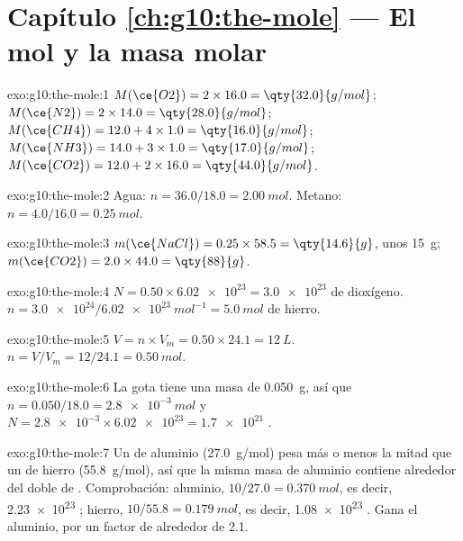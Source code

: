 \section*{Capítulo \ref{ch:g10:the-mole} --- El mol y la masa molar}

\begin{solution}{exo:g10:the-mole:1}
$M(\ce{O2}) = 2 \times 16.0 = \qty{32.0}{g/mol}$;
$M(\ce{N2}) = 2 \times 14.0 = \qty{28.0}{g/mol}$;
$M(\ce{CH4}) = 12.0 + 4 \times 1.0 = \qty{16.0}{g/mol}$;
$M(\ce{NH3}) = 14.0 + 3 \times 1.0 = \qty{17.0}{g/mol}$;
$M(\ce{CO2}) = 12.0 + 2 \times 16.0 = \qty{44.0}{g/mol}$.
\end{solution}

\begin{solution}{exo:g10:the-mole:2}
Agua: $n = 36.0 / 18.0 = \qty{2.00}{mol}$. Metano:
$n = 4.0 / 16.0 = \qty{0.25}{mol}$.
\end{solution}

\begin{solution}{exo:g10:the-mole:3}
$m(\ce{NaCl}) = 0.25 \times 58.5 = \qty{14.6}{g}$, unos \qty{15}{g};
$m(\ce{CO2}) = 2.0 \times 44.0 = \qty{88}{g}$.
\end{solution}

\begin{solution}{exo:g10:the-mole:4}
$N = 0.50 \times \num{6.02e23} = \num{3.0e23}$  de dioxígeno.
$n = \num{3.0e24} / \qty{6.02e23}{mol^{-1}} = \qty{5.0}{mol}$ de hierro.
\end{solution}

\begin{solution}{exo:g10:the-mole:5}
$V = n \times V_m = 0.50 \times 24.1 = \qty{12}{L}$.
$n = V / V_m = 12 / 24.1 = \qty{0.50}{mol}$.
\end{solution}

\begin{solution}{exo:g10:the-mole:6}
La gota tiene una masa de \qty{0.050}{g}, así que
$n = 0.050 / 18.0 = \qty{2.8e-3}{mol}$ y
$N = \num{2.8e-3} \times \num{6.02e23} = \num{1.7e21}$ .
\end{solution}

\begin{solution}{exo:g10:the-mole:7}
Un  de aluminio (\qty{27.0}{g/mol}) pesa más o menos la mitad que
un  de hierro (\qty{55.8}{g/mol}), así que la misma masa de
aluminio contiene alrededor del doble de . Comprobación: aluminio,
$10/27.0 = \qty{0.370}{mol}$, es decir, \num{2.23e23} ; hierro,
$10/55.8 = \qty{0.179}{mol}$, es decir, \num{1.08e23} . Gana el
aluminio, por un factor de alrededor de 2.1.
\end{solution}

